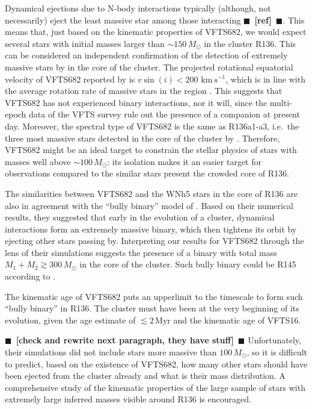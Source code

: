 \documentclass{aa}
\newcommand{\todo}[1]{{\large $\blacksquare$~\textbf{\color{red}[#1]}}~$\blacksquare$}
\newcommand{\kms}{{\,\mathrm{km\ s^{-1}}}}
\begin{document}
{Dynamical ejections due to N-body interactions typically (although, not necessarily) eject the least
massive star among those interacting \todo{ref}. This means that, just
based on the kinematic properties of VFTS682, we would expect several
stars with initial masses larger than $\sim$$150\,M_\odot$ in the
cluster R136.
This can be considered an independent confirmation of the detection
of extremely massive stars by \cite{crowther:10} in the core of the
cluster. The projected rotational equatorial velocity of VFTS682
reported by \cite{schneider:18} is $v\sin(i)<200\,\kms$, which is in
line with the average rotation rate of massive stars in the region
\citep[][]{ramirez-agudelo:15}. This suggests that VFTS682 has not
experienced binary interactions, nor it will, since the multi-epoch
data of the VFTS survey rule out the presence of a companion at
present day. Moreover, the spectral type of VFTS682
\citep[WNh5,][]{bestenlehner:11} is the same as R136a1-a3, i.e.~the
three most massive stars detected in the core of the cluster by
\cite{crowther:10}. Therefore,
VFTS682 might be an ideal target to constrain the stellar physics of
stars with masses well above $\sim100\,M_\odot$: its isolation makes
it an easier target for observations compared to the similar stars present the crowded core of R136.

The similarities between VFTS682 and the WNh5 stars in the core of
R136 are also in agreement with the ``bully binary'' model of
\cite{fujii:11}. Based on their numerical results, they suggested that
early in the evolution of a cluster, dynamical interactions form an extremely
massive binary, which then tightens its orbit by ejecting other stars passing
by. Interpreting our results for VFTS682 through the lens of their simulations
suggests the presence of a binary with total mass
$M_1+M_2\gtrsim 300\,M_\odot$ in the core of the cluster. Such bully
binary could be R145 according to \cite{fujii:11}.

The kinematic age of VFTS682 puts an
upperlimit to the timescale to form such ``bully binary'' in
R136. The cluster must have been at the very beginning of its
evolution, given the age estimate of $\lesssim 2$\,Myr
\cite{crowther:10,sabbi:12} and the kinematic age of VFTS16.

\todo{check \cite{banerjee} and rewrite next paragraph, they
  have stuff} Unfortunately, their simulations did not include stars more
massive than $100\,M_\odot$, so it is difficult to predict, based on
the existence of VFTS682, how many other stars should have been
ejected from the cluster already and what is their mass
distribution. A comprehensive study of the kinematic properties of the
large sample of stars with extremely large inferred masses visible
around R136 is encouraged.  

}
\end{document}

